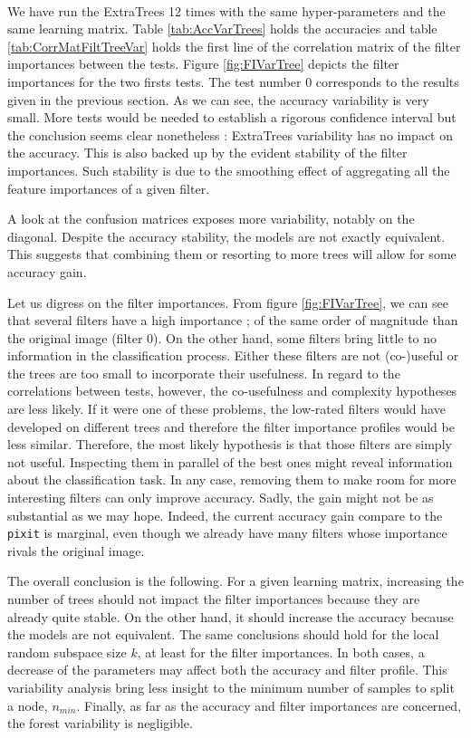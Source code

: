 \documentclass[a4paper]{report}
\begin{document}
		
		\paragraph{}
		We have run the ExtraTrees 12 times with the same hyper-parameters and the same learning matrix. Table \ref{tab:AccVarTrees} holds the accuracies and table \ref{tab:CorrMatFiltTreeVar} holds the first line of the correlation matrix of the filter importances between the tests. Figure \ref{fig:FIVarTree} depicts the filter importances for the two firsts tests. The test number 0 corresponds to the results given in the previous section. As we can see, the accuracy variability is very small. More tests would be needed to establish a rigorous confidence interval but the conclusion seems clear nonetheless : ExtraTrees variability has no impact on the accuracy. This is also backed up by the evident stability of the filter importances. Such stability is due to the smoothing effect of aggregating all the feature importances of a given filter.
		\par
		A look at the confusion matrices exposes more variability, notably on the diagonal. Despite the accuracy stability, the models are not exactly equivalent. This suggests that combining them or resorting to more trees will allow for some accuracy gain.
		\par
		Let us digress on the filter importances. From figure \ref{fig:FIVarTree}, we can see that several filters have a high importance ; of the same order of magnitude than the original image (filter 0). On the other hand, some filters bring little to no information in the classification process. Either these filters are not (co-)useful or the trees are too small to incorporate their usefulness. In regard to the correlations between tests, however, the co-usefulness and complexity hypotheses are less likely. If it were one of these problems, the low-rated filters would have developed on different trees and therefore the filter importance profiles would be less similar. Therefore, the most likely hypothesis is that those filters are simply not useful. Inspecting them in parallel of the best ones might reveal information about the classification task. In any case, removing them to make room for more interesting filters can only improve accuracy. Sadly, the gain might not be as substantial as we may hope. Indeed, the current accuracy gain compare to the \texttt{pixit} is marginal, even though we already have many filters whose importance rivals the original image. 
		\par
		The overall conclusion is the following. For a given learning matrix, increasing the number of trees should not impact the filter importances because they are already quite stable. On the other hand, it should increase the accuracy because the models are not equivalent. The same conclusions should hold for the local random subspace size $k$, at least for the filter importances. In both cases, a decrease of the parameters may affect both the accuracy and filter profile. This variability analysis bring less insight to the minimum number of samples to split a node, $n_{min}$. Finally, as far as the accuracy and filter importances are concerned, the forest variability is negligible.
	
\end{document}
